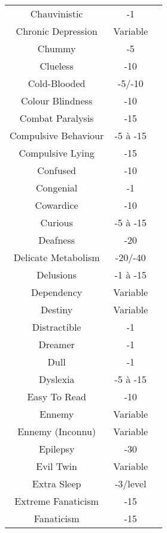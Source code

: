 \begin{center}
\begin{supertabular}{|c|c|c|}
Chauvinistic & -1 & \cite[87]{CI} \\
Chronic Depression & Variable & \cite[87]{CI} \\
Chummy & -5 & \cite[87]{CI} \\
Clueless & -10 & \cite[87]{CI} \\
Cold-Blooded & -5/-10 & \cite[p.101]{CI} \\
Colour Blindness & -10 & \cite[28]{B} \\
Combat Paralysis & -15 & \cite[32]{B} \\
Compulsive Behaviour & -5 à -15 & \cite[32]{B} \\
Compulsive Lying & -15 & \cite[32]{B} \\
Confused & -10 & \cite[88]{CI} \\
Congenial & -1 & \cite[89]{CI} \\
Cowardice & -10 & \cite[32]{B} \\
Curious & -5 à -15 & \cite[89]{CI} \\
Deafness & -20 & \cite[28]{B} \\
Delicate Metabolism & -20/-40 & \cite[81]{B} \\
Delusions & -1 à -15 & \cite[32]{B} \\
Dependency & Variable & \cite[81]{CI} \\
Destiny & Variable & \cite[97]{CI} \\
Distractible & -1 & \cite[89]{CI} \\
Dreamer & -1 & \cite[89]{CI} \\
Dull & -1 & \cite[89]{CI} \\
Dyslexia & -5 à -15 & \cite[33]{B} \\
Easy To Read & -10 & \cite[89]{CI} \\
Ennemy & Variable & \cite[39]{B} \\
Ennemy (Inconnu) & Variable & \cite[77]{CI} \\
Epilepsy & -30 & \cite[28]{B} \\
Evil Twin & Variable & \cite[77]{CI} \\
Extra Sleep & -3/level & \cite[81]{CI} \\
Extreme Fanaticism & -15 & \cite[90]{CI} \\
Fanaticism & -15 & \cite[33]{B} \\

\end{supertabular}
\end{center}
